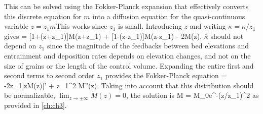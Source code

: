 This can be solved using the Fokker-Planck expansion \citep{Gardiner1983} that effectively converts this discrete \DIFdelbegin {}\DIFdelend \DIFaddbegin {}\DIFaddend equation for $m$ into a diffusion equation for the quasi-continuous variable $z=z_1 m$\DIFaddbegin {}\DIFaddend This works since $z_1$ is small. Introducing $z$ and writing $\overline{\kappa}=\kappa/z_1$ gives
 = [1+\overline{\kappa}(z+z_1)]M(z+z_1) + [1-\overline{\kappa}(z-z_1)]M(z-z_1) - 2M(z).\ee
$\overline{\kappa}$ should not depend on $z_1$ since the magnitude of the feedbacks between bed elevations and entrainment and deposition rates depends on elevation changes, and not on the size of grains or the length of the control volume.
Expanding the entire first and second terms to second order $z_1$ provides the Fokker-Planck equation
 = -2\overline{\kappa}z_1[zM(z)]' + z_1^2 M''(z). \ee
Taking into account that this distribution should be normalizable, \DIFaddbegin \newline \DIFaddend $\lim_{z\rightarrow \pm \infty}M(z) = 0$, the solution is
\be M = M_0e^{-\kappa (z/z_1)^2}\ee
as provided in \DIFdelbegin {}\DIFdelend \DIFaddbegin {}\DIFaddend \ref{ch:ch3}.

